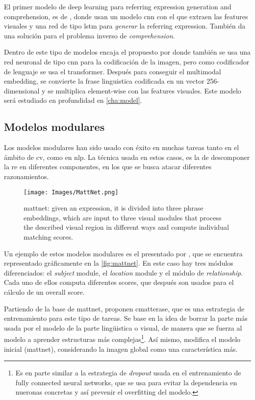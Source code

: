 El primer modelo de deep learning para referring expression generation and
comprehension, es de , donde usan un modelo \gls{cnn} con
el que extraen las features visuales y una red de tipo \gls{lstm} para
\emph{generar} la referring expression. También da una solución para el
problema inverso de \emph{comprehension}.

Dentro de este tipo de modelos encaja el propuesto por
 donde también se usa una red neuronal de tipo
\gls{cnn} para la codificación de la imagen, pero como codificador de lenguaje
se usa el transformer. Después para conseguir el multimodal embedding, se
convierte la frase linguistica codificada en un vector 256-dimensional y se
multiplica element-wise con las features visuales. Este modelo será estudiado
en profundidad en \vref{cha:model}.

\subsection{Modelos modulares} \label{sec:modular}
Los modelos modulares han sido usado con éxito en muchas tareas tanto en el
ámbito de \gls{cv}, como en \gls{nlp}. La técnica usada en estos casos, es la
de descomponer la \gls{re} en diferentes componentes, en los que se busca
atacar diferentes razonamientos.

\begin{figure}[ht]
  \centering
  \texttt{[image: Images/MattNet.png]}
  \caption[\acl*{mattnet}]{\gls{mattnet}: given an expression, it is divided
    into three phrase embeddings, which are input to three visual modules that
    process the described visual region in different ways and compute
    individual matching scores.}
  \label{fig:mattnet}
\end{figure}

Un ejemplo de estos modelos modulares es el presentado por ,
que se encuentra representado gráficamente en la \vref{fig:mattnet}. En este
caso hay tres módulos diferenciados: el \emph{subject} module, el
\emph{location} module y el módulo de \emph{relationship}. Cada uno de ellos
computa diferentes scores, que después son usados para el cálculo de un overall
score.

Partiendo de la base de \gls{mattnet},
 proponen
\gls{cmatterase}, que es una estrategia de entrenamiento para este tipo de
tareas. Se base en la idea de borrar la parte más usada por el modelo de la
parte lingüistica o visual, de manera que se fuerza al modelo a aprender
estructuras más complejas\footnote{Es en parte similar a la estrategia de
  \emph{dropout} usada en el entrenamiento de fully connected neural networks,
  que se usa para evitar la dependencia en nueronas concretas y así prevenir el
  overfitting del modelo.}. Así mismo, modifica el modelo inicial
(\gls{mattnet}), considerando la imagen global como una característica más.

